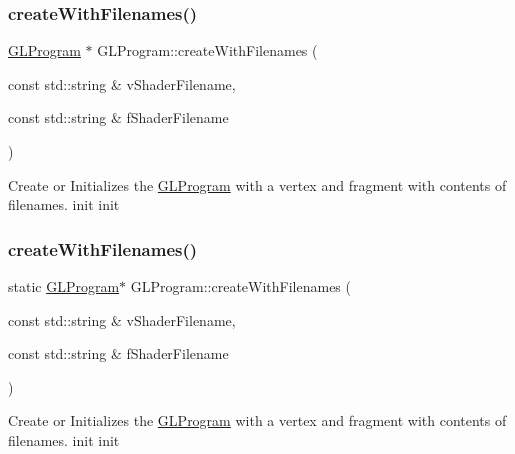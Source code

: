 \subsubsection{\texorpdfstring{create\+With\+Filenames()}{createWithFilenames()}\hspace{0.1cm}{\footnotesize\ttfamily [1/3]}}
{\footnotesize\ttfamily \hyperlink{classGLProgram}{G\+L\+Program} $\ast$ G\+L\+Program\+::create\+With\+Filenames (\begin{DoxyParamCaption}\item[{const std\+::string \&}]{v\+Shader\+Filename,  }\item[{const std\+::string \&}]{f\+Shader\+Filename }\end{DoxyParamCaption})\hspace{0.3cm}{\ttfamily [static]}}

Create or Initializes the \hyperlink{classGLProgram}{G\+L\+Program} with a vertex and fragment with contents of filenames.  init  init \mbox{\label{classGLProgram_ad09803f1ee7fdb2b215d15ae907e309e}} 
\subsubsection{\texorpdfstring{create\+With\+Filenames()}{createWithFilenames()}\hspace{0.1cm}{\footnotesize\ttfamily [2/3]}}
{\footnotesize\ttfamily static \hyperlink{classGLProgram}{G\+L\+Program}$\ast$ G\+L\+Program\+::create\+With\+Filenames (\begin{DoxyParamCaption}\item[{const std\+::string \&}]{v\+Shader\+Filename,  }\item[{const std\+::string \&}]{f\+Shader\+Filename }\end{DoxyParamCaption})\hspace{0.3cm}{\ttfamily [static]}}

Create or Initializes the \hyperlink{classGLProgram}{G\+L\+Program} with a vertex and fragment with contents of filenames.  init  init \mbox{\label{classGLProgram_a533d98f6e0a1ad17c3480e623992e402}} 
